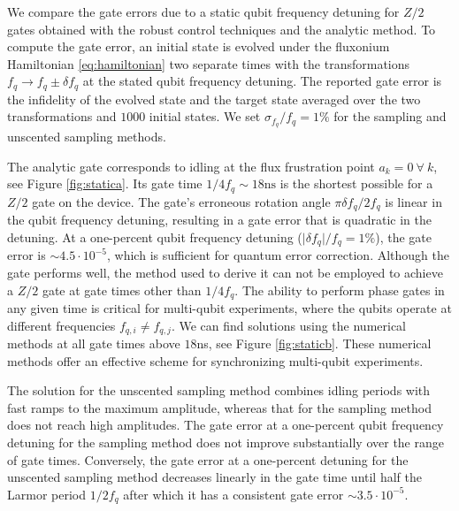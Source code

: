 We compare the gate errors due to a static qubit frequency
detuning for $Z/2$ gates obtained with the robust control techniques
and the analytic method.
To compute the gate error,
an initial state is evolved
under the fluxonium Hamiltonian \eqref{eq:hamiltonian}
two separate times with the transformations
$f_{q} \rightarrow f_{q} \pm \delta f_{q}$
at the stated qubit frequency detuning.
The reported gate error is the infidelity of
the evolved state and the target state averaged over
the two transformations and $1000$ initial states.
We set $\sigma_{f_{q}}/f_{q} = 1\%$
for the sampling and unscented sampling
methods.

The analytic gate corresponds to
idling at the flux frustration point $a_{k} = 0 \ \forall \ k$, see Figure
\ref{fig:statica}. Its gate time $1 / 4 f_{q} \sim 18\textrm{ns}$
is the shortest possible for a $Z/2$ gate on the device.
The gate's erroneous rotation angle
$\pi \delta f_{q} / 2 f_{q}$ is linear in the
qubit frequency detuning, resulting in a gate error that is quadratic
in the detuning.
At a one-percent
qubit frequency detuning ($\lvert \delta f_{q} \rvert / f_{q} = 1\%$),
the gate error is $\sim 4.5 \cdot 10^{-5}$,
which is sufficient for quantum error correction.
Although the gate performs well, the method used to derive
it can not be employed to achieve a $Z/2$ gate at gate times other than
$1 / 4 f_{q}$. The ability to perform
phase gates in any given time is critical
for multi-qubit experiments, where the qubits operate at different
frequencies $f_{q, i} \neq f_{q, j}$.
We can find solutions using the numerical methods at
all gate times above $18$ns, see Figure \ref{fig:staticb}.
These numerical methods offer an effective scheme for synchronizing
multi-qubit experiments.

The solution for the unscented sampling method combines idling periods
with fast ramps to the maximum amplitude, whereas that for the sampling method
does not reach high amplitudes.
The gate error at a one-percent qubit frequency detuning for the sampling method
does not improve substantially over the
range of gate times. Conversely, the gate error at a one-percent detuning
for the unscented sampling method decreases linearly in the gate time
until half the Larmor period $1 / 2 f_{q}$ after which it has a consistent
gate error $\sim 3.5 \cdot 10^{-5}$.

